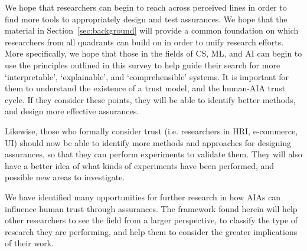     We hope that researchers can begin to reach across perceived lines in order to find more tools to appropriately design and test assurances. We hope that the material in Section~\ref{sec:background} will provide a common foundation on which researchers from all quadrants can build on in order to unify research efforts. More specifically, we hope that those in the fields of CS, ML, and AI can begin to use the principles outlined in this survey to help guide their search for more `interpretable', `explainable', and `comprehensible' systems. It is important for them to understand the existence of a trust model, and the human-AIA trust cycle. If they consider these points, they will be able to identify better methods, and design more effective assurances.
    
    Likewise, those who formally consider trust (i.e. researchers in HRI, e-commerce, UI) should now be able to identify more methods and approaches for designing assurances, so that they can perform experiments to validate them. They will also have a better idea of what kinds of experiments have been performed, and possible new areas to investigate.

    We have identified many opportunities for further research in how AIAs can influence human trust through assurances. The framework found herein will help other researchers to see the field from a larger perspective, to classify the type of research they are performing, and help them to consider the greater implications of their work.
